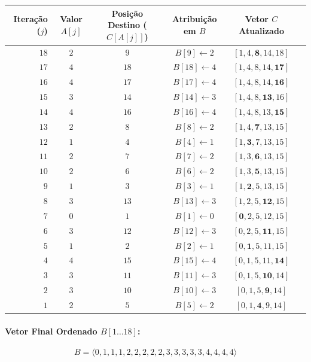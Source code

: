 \documentclass[11pt,a4paper]{article}
\begin{document}
\begin{center}
\small
\begin{tabular}{rccccc}
\toprule
\textbf{Iteração ($j$)} & \textbf{Valor $A[j]$} & \textbf{Posição Destino ($C[A[j]]$)} & \textbf{Atribuição em $B$} & \textbf{Vetor $C$ Atualizado} \\
\midrule
$18$ & $2$ & $9$  & $B[9] \leftarrow 2$  & $[1, 4, \mathbf{8}, 14, 18]$ \\
$17$ & $4$ & $18$ & $B[18] \leftarrow 4$ & $[1, 4, 8, 14, \mathbf{17}]$ \\
$16$ & $4$ & $17$ & $B[17] \leftarrow 4$ & $[1, 4, 8, 14, \mathbf{16}]$ \\
$15$ & $3$ & $14$ & $B[14] \leftarrow 3$ & $[1, 4, 8, \mathbf{13}, 16]$ \\
$14$ & $4$ & $16$ & $B[16] \leftarrow 4$ & $[1, 4, 8, 13, \mathbf{15}]$ \\
$13$ & $2$ & $8$  & $B[8] \leftarrow 2$  & $[1, 4, \mathbf{7}, 13, 15]$ \\
$12$ & $1$ & $4$  & $B[4] \leftarrow 1$  & $[1, \mathbf{3}, 7, 13, 15]$ \\
$11$ & $2$ & $7$  & $B[7] \leftarrow 2$  & $[1, 3, \mathbf{6}, 13, 15]$ \\
$10$ & $2$ & $6$  & $B[6] \leftarrow 2$  & $[1, 3, \mathbf{5}, 13, 15]$ \\
$9$  & $1$ & $3$  & $B[3] \leftarrow 1$  & $[1, \mathbf{2}, 5, 13, 15]$ \\
$8$  & $3$ & $13$ & $B[13] \leftarrow 3$ & $[1, 2, 5, \mathbf{12}, 15]$ \\
$7$  & $0$ & $1$  & $B[1] \leftarrow 0$  & $[\mathbf{0}, 2, 5, 12, 15]$ \\
$6$  & $3$ & $12$ & $B[12] \leftarrow 3$ & $[0, 2, 5, \mathbf{11}, 15]$ \\
$5$  & $1$ & $2$  & $B[2] \leftarrow 1$  & $[0, \mathbf{1}, 5, 11, 15]$ \\
$4$  & $4$ & $15$ & $B[15] \leftarrow 4$ & $[0, 1, 5, 11, \mathbf{14}]$ \\
$3$  & $3$ & $11$ & $B[11] \leftarrow 3$ & $[0, 1, 5, \mathbf{10}, 14]$ \\
$2$  & $3$ & $10$ & $B[10] \leftarrow 3$ & $[0, 1, 5, \mathbf{9}, 14]$ \\
$1$  & $2$ & $5$  & $B[5] \leftarrow 2$  & $[0, 1, \mathbf{4}, 9, 14]$ \\
\bottomrule
\end{tabular}
\end{center}

\paragraph{Vetor Final Ordenado $B[1 \dots 18]$:}
\[
B = \langle 0, 1, 1, 1, 2, 2, 2, 2, 2, 3, 3, 3, 3, 3, 4, 4, 4, 4 \rangle
\]
\end{document}

